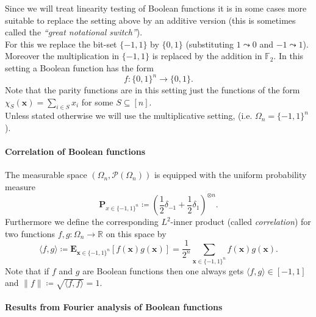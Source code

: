 \documentclass[a4paper]{article}
\newcommand{\prob}{\mathbf{P}}
\newcommand{\expe}{\mathbf{E}}
\newcommand{\real}{\mathbb{R}}
\newcommand{\nset}{[n]}
\newcommand{\boldx}{\boldsymbol{x}}
\theoremstyle{plain}
\theoremstyle{definition}
\theoremstyle{remark}
\begin{document}
Since we will treat linearity testing of Boolean functions it is in
some cases more suitable to replace the setting above by an
additive version (this is sometimes called the \emph{``great
  notational switch''}).\\
For this we replace the bit-set \(\{-1,1\}\) by \(\{0,1\}\)
(substituting \(1 \leadsto 0 \) and \(-1 \leadsto 1\)).  
Moreover the multiplication in \(\{-1,1\}\) is replaced by the
addition in \(\mathbb{F}_2\). 
In this setting a Boolean function has the form 
\[f: \{0,1\}^n \rightarrow \{0,1\}.\]
Note that the parity functions are in this setting just the functions of
the form \(\chi_S(\boldx) = \sum_{i\in S} x_i\) for some \(S\subseteq
\nset\). \\

\noindent Unless stated otherwise we will use the multiplicative setting, (i.e.
\(\Omega_n = \{-1,1\}^n\)). 


\paragraph{Correlation of Boolean functions}
\label{sec:corr-bool-funct}

\noindent The measurable space \(\left(\Omega_n, \mathcal{P}(\Omega_n)\right)\)
is equipped with the uniform probability measure \[\prob_{x \in
  \{-1,1\}^n} \coloneqq \left(\frac{1}{2} \delta_{-1} +
  \frac{1}{2}\delta_1\right)^{\otimes n}.\]
Furthermore we define the corresponding \(L^2\)-inner product (called \emph{correlation}) for two
functions \(f,g: \Omega_n \rightarrow \real\) on this space by 
\[\langle f,g\rangle \coloneqq \expe_{\boldx \in
  \{-1,1\}^n}\left[f(\boldx)g(\boldx)\right] = \frac{1}{2^n}\sum_{\boldx \in \{-1,1\}^n} f(\boldx)g(\boldx).\]
Note that if \(f\) and \(g\) are Boolean functions then one always
gets \(\langle f, g\rangle \in [-1,1]\) and \(\|f\| \coloneqq
\sqrt{\langle f, f\rangle } = 1\).  

\paragraph{Results from Fourier analysis of Boolean functions}
\label{sec:results-from-fourier}
\end{document}

